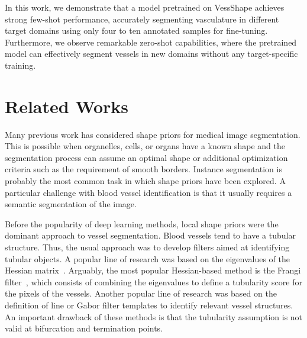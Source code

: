 \documentclass[%
reprint,
nofootinbib,
 amsmath,amssymb,
aps,
superscriptaddress,
showkeys,
longbibliography
]{revtex4-1}
\begin{document}
In this work, we demonstrate that a model pretrained on VessShape achieves strong few-shot performance, accurately segmenting vasculature in different target domains using only four to ten annotated samples for fine-tuning. Furthermore, we observe remarkable zero-shot capabilities, where the pretrained model can effectively segment vessels in new domains without any target-specific training.

\section{Related Works}
\label{sec:related}

Many previous work has considered shape priors for medical image segmentation. This is possible when organelles, cells, or organs have a known shape and the segmentation process can assume an optimal shape or additional optimization criteria such as the requirement of smooth borders. Instance segmentation is probably the most common task in which shape priors have been explored. A particular challenge with blood vessel identification is that it usually requires a semantic segmentation of the image. 

Before the popularity of deep learning methods, local shape priors were the dominant approach to vessel segmentation. Blood vessels tend to have a tubular structure. Thus, the usual approach was to develop filters aimed at identifying tubular objects. A popular line of research was based on the eigenvalues of the Hessian matrix~\cite{fraz2012blood,sato1998three}. Arguably, the most popular Hessian-based method is the Frangi filter~\cite{frangi1998multiscale}, which consists of combining the eigenvalues to define a tubularity score for the pixels of the vessels. Another popular line of research was based on the definition of line or Gabor filter templates to identify relevant vessel structures. An important drawback of these methods is that the tubularity assumption is not valid at bifurcation and termination points.
\end{document}
